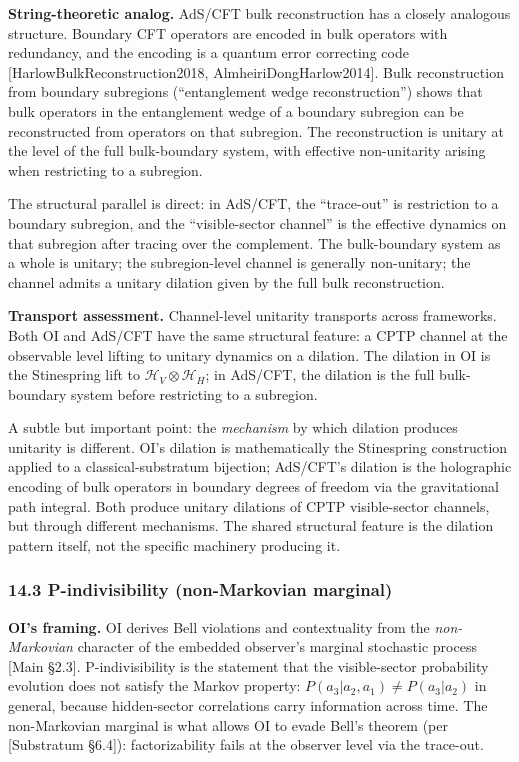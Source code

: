 \documentclass[
]{article}
\begin{document}
\textbf{String-theoretic analog.} AdS/CFT bulk reconstruction has a
closely analogous structure. Boundary CFT operators are encoded in bulk
operators with redundancy, and the encoding is a quantum error
correcting code {[}HarlowBulkReconstruction2018,
AlmheiriDongHarlow2014{]}. Bulk reconstruction from boundary subregions
(``entanglement wedge reconstruction'') shows that bulk operators in the
entanglement wedge of a boundary subregion can be reconstructed from
operators on that subregion. The reconstruction is unitary at the level
of the full bulk-boundary system, with effective non-unitarity arising
when restricting to a subregion.

The structural parallel is direct: in AdS/CFT, the ``trace-out'' is
restriction to a boundary subregion, and the ``visible-sector channel''
is the effective dynamics on that subregion after tracing over the
complement. The bulk-boundary system as a whole is unitary; the
subregion-level channel is generally non-unitary; the channel admits a
unitary dilation given by the full bulk reconstruction.

\textbf{Transport assessment.} Channel-level unitarity transports across
frameworks. Both OI and AdS/CFT have the same structural feature: a CPTP
channel at the observable level lifting to unitary dynamics on a
dilation. The dilation in OI is the Stinespring lift to
\(\mathcal{H}_V \otimes \mathcal{H}_H\); in AdS/CFT, the dilation is the
full bulk-boundary system before restricting to a subregion.

A subtle but important point: the \emph{mechanism} by which dilation
produces unitarity is different. OI's dilation is mathematically the
Stinespring construction applied to a classical-substratum bijection;
AdS/CFT's dilation is the holographic encoding of bulk operators in
boundary degrees of freedom via the gravitational path integral. Both
produce unitary dilations of CPTP visible-sector channels, but through
different mechanisms. The shared structural feature is the dilation
pattern itself, not the specific machinery producing it.

\hypertarget{p-indivisibility-non-markovian-marginal}{%
\subsubsection{14.3 P-indivisibility (non-Markovian
marginal)}\label{p-indivisibility-non-markovian-marginal}}

\textbf{OI's framing.} OI derives Bell violations and contextuality from
the \emph{non-Markovian} character of the embedded observer's marginal
stochastic process {[}Main §2.3{]}. P-indivisibility is the statement
that the visible-sector probability evolution does not satisfy the
Markov property: \(P(a_3 | a_2, a_1) \neq P(a_3 | a_2)\) in general,
because hidden-sector correlations carry information across time. The
non-Markovian marginal is what allows OI to evade Bell's theorem (per
{[}Substratum §6.4{]}): factorizability fails at the observer level via
the trace-out.
\end{document}
